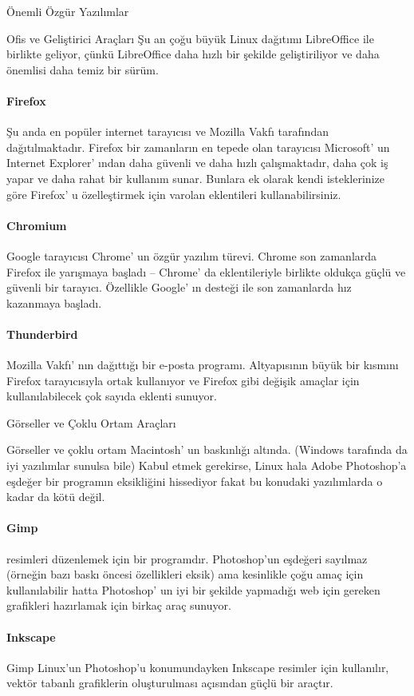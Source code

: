 \begin{section}{Önemli Özgür Yazılımlar}
\begin{subsection}{Ofis ve Geliştirici Araçları}
Şu an çoğu büyük Linux dağıtımı LibreOffice ile birlikte geliyor, çünkü LibreOffice daha hızlı bir şekilde geliştiriliyor ve daha önemlisi daha temiz bir sürüm.
\paragraph{Firefox}{Şu anda en popüler internet tarayıcısı ve Mozilla Vakfı tarafından dağıtılmaktadır. Firefox bir zamanların en tepede olan tarayıcısı Microsoft' un Internet Explorer' ından daha güvenli ve daha hızlı çalışmaktadır, daha çok iş yapar ve daha rahat bir kullanım sunar. Bunlara ek olarak kendi isteklerinize göre Firefox' u özelleştirmek için varolan eklentileri kullanabilirsiniz.}
\paragraph{Chromium}{Google tarayıcısı Chrome' un özgür yazılım türevi. Chrome son zamanlarda Firefox ile yarışmaya başladı – Chrome' da eklentileriyle birlikte oldukça güçlü ve güvenli bir tarayıcı. Özellikle Google' ın desteği ile son zamanlarda hız kazanmaya başladı.}
\paragraph{Thunderbird}{Mozilla Vakfı' nın dağıttığı bir e-posta programı. Altyapısının büyük bir kısmını Firefox tarayıcısıyla ortak kullanıyor ve Firefox gibi değişik amaçlar için kullanılabilecek çok sayıda eklenti sunuyor.}
\end{subsection}
\begin{subsection}{Görseller ve Çoklu Ortam Araçları}

Görseller ve çoklu ortam Macintosh' un baskınlığı altında. (Windows tarafında da iyi yazılımlar sunulsa bile) Kabul etmek gerekirse, Linux hala Adobe Photoshop'a eşdeğer bir programın eksikliğini hissediyor fakat bu konudaki yazılımlarda o kadar da kötü değil.

\paragraph{Gimp}{resimleri düzenlemek için bir programdır. Photoshop'un eşdeğeri sayılmaz (örneğin bazı baskı öncesi özellikleri eksik) ama kesinlikle çoğu amaç için kullanılabilir hatta Photoshop' un iyi bir şekilde yapmadığı web için gereken grafikleri hazırlamak için birkaç araç sunuyor.}
\paragraph{Inkscape}{Gimp Linux'un Photoshop'u konumundayken Inkscape resimler için kullanılır, vektör tabanlı grafiklerin oluşturulması açısından güçlü bir araçtır.}

\end{subsection}
\end{section}
